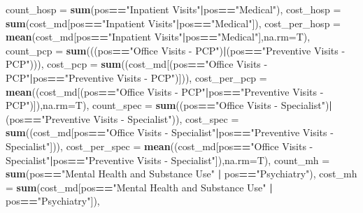 \documentclass[]{article}
\newenvironment{Shaded}{\begin{snugshade}}{\end{snugshade}}
\newcommand{\KeywordTok}[1]{\textcolor[rgb]{0.13,0.29,0.53}{\textbf{#1}}}
\newcommand{\DataTypeTok}[1]{\textcolor[rgb]{0.13,0.29,0.53}{#1}}
\newcommand{\StringTok}[1]{\textcolor[rgb]{0.31,0.60,0.02}{#1}}
\newcommand{\OperatorTok}[1]{\textcolor[rgb]{0.81,0.36,0.00}{\textbf{#1}}}
\newcommand{\NormalTok}[1]{#1}
\begin{document}
\begin{Shaded}
\begin{Highlighting}[]
{{{            \DataTypeTok{count_hosp =} \KeywordTok{sum}\NormalTok{(pos}\OperatorTok{==}\StringTok{"Inpatient Visits"}\OperatorTok{|}\NormalTok{pos}\OperatorTok{==}\StringTok{"Medical"}\NormalTok{),}
            \DataTypeTok{cost_hosp =} \KeywordTok{sum}\NormalTok{(cost_md[pos}\OperatorTok{==}\StringTok{"Inpatient Visits"}\OperatorTok{|}\NormalTok{pos}\OperatorTok{==}\StringTok{"Medical"}\NormalTok{]),}
            \DataTypeTok{cost_per_hosp =} \KeywordTok{mean}\NormalTok{(cost_md[pos}\OperatorTok{==}\StringTok{"Inpatient Visits"}\OperatorTok{|}\NormalTok{pos}\OperatorTok{==}\StringTok{"Medical"}\NormalTok{],}\DataTypeTok{na.rm=}\NormalTok{T),}
            \DataTypeTok{count_pcp =} \KeywordTok{sum}\NormalTok{(((pos}\OperatorTok{==}\StringTok{"Office Visits - PCP"}\NormalTok{)}\OperatorTok{|}\NormalTok{(pos}\OperatorTok{==}\StringTok{"Preventive Visits - PCP"}\NormalTok{))),}
            \DataTypeTok{cost_pcp =} \KeywordTok{sum}\NormalTok{((cost_md[(pos}\OperatorTok{==}\StringTok{"Office Visits - PCP"}\OperatorTok{|}\NormalTok{pos}\OperatorTok{==}\StringTok{"Preventive Visits - PCP"}\NormalTok{)])),}
            \DataTypeTok{cost_per_pcp =} \KeywordTok{mean}\NormalTok{((cost_md[(pos}\OperatorTok{==}\StringTok{"Office Visits - PCP"}\OperatorTok{|}\NormalTok{pos}\OperatorTok{==}\StringTok{"Preventive Visits - PCP"}\NormalTok{)]),}\DataTypeTok{na.rm=}\NormalTok{T),}
            \DataTypeTok{count_spec =} \KeywordTok{sum}\NormalTok{((pos}\OperatorTok{==}\StringTok{"Office Visits - Specialist"}\NormalTok{)}\OperatorTok{|}\NormalTok{(pos}\OperatorTok{==}\StringTok{"Preventive Visits - Specialist"}\NormalTok{)),}
            \DataTypeTok{cost_spec =} \KeywordTok{sum}\NormalTok{((cost_md[pos}\OperatorTok{==}\StringTok{"Office Visits - Specialist"}\OperatorTok{|}\NormalTok{pos}\OperatorTok{==}\StringTok{"Preventive Visits - Specialist"}\NormalTok{])),}
            \DataTypeTok{cost_per_spec =} \KeywordTok{mean}\NormalTok{((cost_md[pos}\OperatorTok{==}\StringTok{"Office Visits - Specialist"}\OperatorTok{|}\NormalTok{pos}\OperatorTok{==}\StringTok{"Preventive Visits - Specialist"}\NormalTok{]),}\DataTypeTok{na.rm=}\NormalTok{T),}
            \DataTypeTok{count_mh =} \KeywordTok{sum}\NormalTok{(pos}\OperatorTok{==}\StringTok{"Mental Health and Substance Use"} \OperatorTok{|}\StringTok{ }\NormalTok{pos}\OperatorTok{==}\StringTok{"Psychiatry"}\NormalTok{),}
            \DataTypeTok{cost_mh =} \KeywordTok{sum}\NormalTok{(cost_md[pos}\OperatorTok{==}\StringTok{"Mental Health and Substance Use"} \OperatorTok{|}\StringTok{ }\NormalTok{pos}\OperatorTok{==}\StringTok{"Psychiatry"}\NormalTok{]),}
}}}
\end{Highlighting}
\end{Shaded}
\end{document}
